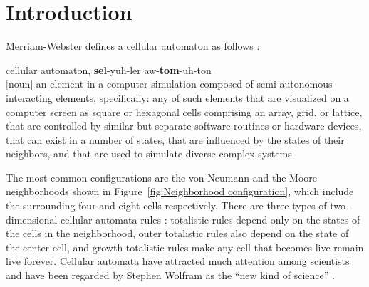 \documentclass[12pt]{article}
\numberwithin{figure}{section} %
\begin{document}
\newpage
\thispagestyle{plain}
\listoffigures
\newpage
\thispagestyle{plain}
\listoftables
\newpage
\thispagestyle{plain}
\tableofcontents
\thispagestyle{plain}

\pagestyle{fancy}
\fancyhf{}
\rhead{\thepage}
\renewcommand{\headrulewidth}{0.4pt}
\newpage
\section{Introduction}
\label{Introduction}
Merriam-Webster defines a cellular automaton as follows \cite{MW}: \\
\begin{adjustwidth}{1cm}{1cm}
\vspace{-1cm}
\begin{small} 
\begin{spacing}{1}
cellular automaton, \textbf{sel}-yuh-ler aw-\textbf{tom}-uh-ton\\ 
$[$noun$]$
\newline
an element in a computer simulation composed of semi-autonomous interacting elements, specifically: any of such elements that are visualized on a computer screen as square or hexagonal cells comprising an array, grid, or lattice, that are controlled by similar but separate software routines or hardware devices, that can exist in a number of states, that are influenced by the states of their neighbors, and that are used to simulate diverse complex systems. 
\end{spacing}
\end{small}
\vspace{-0.1cm}
\end{adjustwidth}
The most common configurations are the von Neumann and the Moore neighborhoods shown in Figure~\ref{fig:Neighborhood configuration}, which include the surrounding four and eight cells respectively. There are three types of two-dimensional cellular automata rules \cite{A new kind of Science}: totalistic rules depend only on the states of the cells in the neighborhood, outer totalistic rules also depend on the state of the center cell, and growth totalistic rules make any cell that becomes live remain live forever. Cellular automata have attracted much attention among scientists and have been regarded by Stephen Wolfram as the “new kind of science” \cite{A new kind of Science}. 
\end{document}
